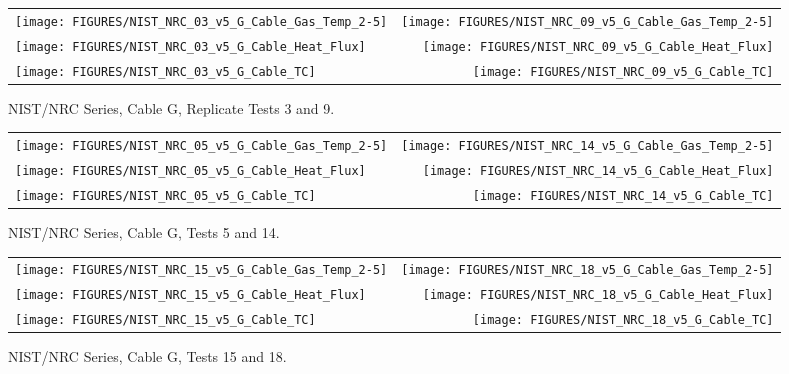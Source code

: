 \begin{figure}[h]
\begin{tabular*}{\textwidth}{l@{\extracolsep{\fill}}r}
\texttt{[image: FIGURES/NIST\_NRC\_03\_v5\_G\_Cable\_Gas\_Temp\_2-5]} &
\texttt{[image: FIGURES/NIST\_NRC\_09\_v5\_G\_Cable\_Gas\_Temp\_2-5]} \\
\texttt{[image: FIGURES/NIST\_NRC\_03\_v5\_G\_Cable\_Heat\_Flux]} &
\texttt{[image: FIGURES/NIST\_NRC\_09\_v5\_G\_Cable\_Heat\_Flux]} \\
\texttt{[image: FIGURES/NIST\_NRC\_03\_v5\_G\_Cable\_TC]} &
\texttt{[image: FIGURES/NIST\_NRC\_09\_v5\_G\_Cable\_TC]}
\end{tabular*}
\caption{NIST/NRC Series, Cable G, Replicate Tests 3 and 9.}
\label{NIST_NRC_G_3_and_9}
\end{figure}

\begin{figure}[h]
\begin{tabular*}{\textwidth}{l@{\extracolsep{\fill}}r}
\texttt{[image: FIGURES/NIST\_NRC\_05\_v5\_G\_Cable\_Gas\_Temp\_2-5]} &
\texttt{[image: FIGURES/NIST\_NRC\_14\_v5\_G\_Cable\_Gas\_Temp\_2-5]} \\
\texttt{[image: FIGURES/NIST\_NRC\_05\_v5\_G\_Cable\_Heat\_Flux]} &
\texttt{[image: FIGURES/NIST\_NRC\_14\_v5\_G\_Cable\_Heat\_Flux]} \\
\texttt{[image: FIGURES/NIST\_NRC\_05\_v5\_G\_Cable\_TC]} &
\texttt{[image: FIGURES/NIST\_NRC\_14\_v5\_G\_Cable\_TC]}
\end{tabular*}
\caption{NIST/NRC Series, Cable G, Tests 5 and 14.}
\label{NIST_NRC_G_5_and_14}
\end{figure}

\begin{figure}[h]
\begin{tabular*}{\textwidth}{l@{\extracolsep{\fill}}r}
\texttt{[image: FIGURES/NIST\_NRC\_15\_v5\_G\_Cable\_Gas\_Temp\_2-5]} &
\texttt{[image: FIGURES/NIST\_NRC\_18\_v5\_G\_Cable\_Gas\_Temp\_2-5]} \\
\texttt{[image: FIGURES/NIST\_NRC\_15\_v5\_G\_Cable\_Heat\_Flux]} &
\texttt{[image: FIGURES/NIST\_NRC\_18\_v5\_G\_Cable\_Heat\_Flux]} \\
\texttt{[image: FIGURES/NIST\_NRC\_15\_v5\_G\_Cable\_TC]} &
\texttt{[image: FIGURES/NIST\_NRC\_18\_v5\_G\_Cable\_TC]}
\end{tabular*}
\caption{NIST/NRC Series, Cable G, Tests 15 and 18.}
\label{NIST_NRC_G_15_and_18}
\end{figure}


